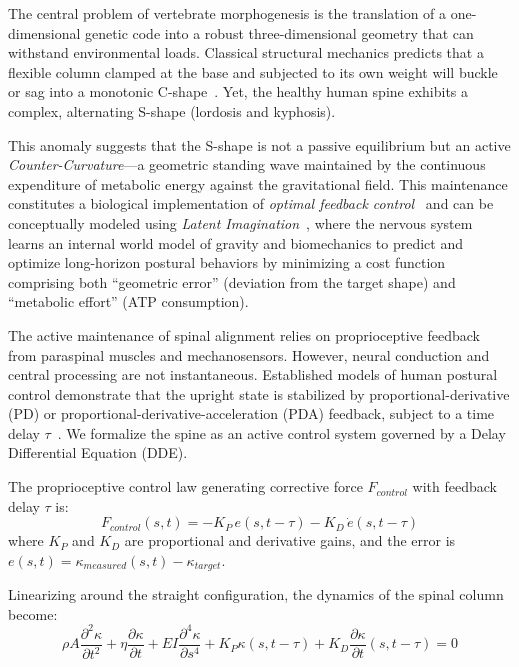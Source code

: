 \documentclass[11pt]{article}
\begin{document}
The central problem of vertebrate morphogenesis is the translation of a one-dimensional genetic code into a robust three-dimensional geometry that can withstand environmental loads. Classical structural mechanics predicts that a flexible column clamped at the base and subjected to its own weight will buckle or sag into a monotonic C-shape~\cite{goriely2017mathematics}. Yet, the healthy human spine exhibits a complex, alternating S-shape (lordosis and kyphosis).

This anomaly suggests that the S-shape is not a passive equilibrium but an active \emph{Counter-Curvature}---a geometric standing wave maintained by the continuous expenditure of metabolic energy against the gravitational field. This maintenance constitutes a biological implementation of \emph{optimal feedback control}~\cite{todorov2002optimal} and can be conceptually modeled using \emph{Latent Imagination}~\cite{hafner2019dreamer}, where the nervous system learns an internal world model of gravity and biomechanics to predict and optimize long-horizon postural behaviors by minimizing a cost function comprising both ``geometric error'' (deviation from the target shape) and ``metabolic effort'' (ATP consumption).



The active maintenance of spinal alignment relies on proprioceptive feedback from paraspinal muscles and mechanosensors. However, neural conduction and central processing are not instantaneous. Established models of human postural control demonstrate that the upright state is stabilized by proportional-derivative (PD) or proportional-derivative-acceleration (PDA) feedback, subject to a time delay $\tau$~\cite{milton2009time, insperger2013acceleration}. We formalize the spine as an active control system governed by a Delay Differential Equation (DDE).

The proprioceptive control law generating corrective force $F_{control}$ with feedback delay $\tau$ is:
\begin{equation}
F_{control}(s,t) = -K_P \, e(s, t-\tau) - K_D \, \dot{e}(s, t-\tau)
\label{eq:pd_control}
\end{equation}
where $K_P$ and $K_D$ are proportional and derivative gains, and the error is $e(s,t) = \kappa_{measured}(s,t) - \kappa_{target}$.

Linearizing around the straight configuration, the dynamics of the spinal column become:
\begin{equation}
\rho A \frac{\partial^2 \kappa}{\partial t^2} + \eta \frac{\partial \kappa}{\partial t} + EI \frac{\partial^4 \kappa}{\partial s^4} + K_P \kappa(s, t-\tau) + K_D \frac{\partial \kappa}{\partial t}(s, t-\tau) = 0
\label{eq:dde_spine}
\end{equation}
\end{document}
